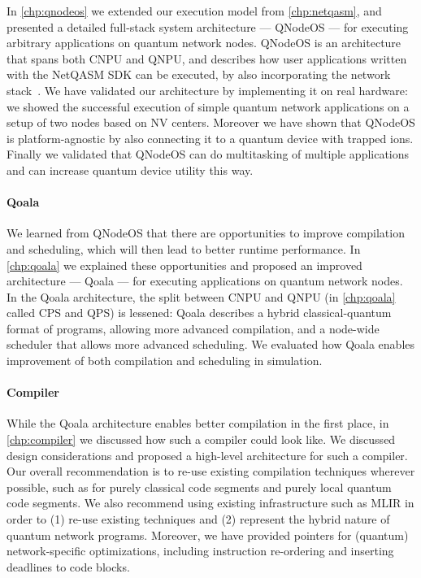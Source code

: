 In \cref{chp:qnodeos} we extended our execution model from \cref{chp:netqasm}, and presented a detailed full-stack system architecture --- QNodeOS --- for executing arbitrary applications on quantum network nodes.
QNodeOS is an architecture that spans both CNPU and QNPU, and describes how user applications written with the NetQASM SDK can be executed, by also incorporating the network stack~\cite{dahlberg2019linklayer,kozlowski2020networklayer}.
We have validated our architecture by implementing it on real hardware: we showed the successful execution of simple quantum network applications on a setup of two nodes based on NV centers.
Moreover we have shown that QNodeOS is platform-agnostic by also connecting it to a quantum device with trapped ions.
Finally we validated that QNodeOS can do multitasking of multiple applications and can increase quantum device utility this way.

\paragraph{Qoala}
We learned from QNodeOS that there are opportunities to improve compilation and scheduling, which will then lead to better runtime performance.
In \cref{chp:qoala} we explained these opportunities and proposed an improved architecture --- Qoala --- for executing applications on quantum network nodes.
In the Qoala architecture, the split between CNPU and QNPU (in \cref{chp:qoala} called CPS and QPS) is lessened: Qoala describes a hybrid classical-quantum format of programs, allowing more advanced compilation, and a node-wide scheduler that allows more advanced scheduling.
We evaluated how Qoala enables improvement of both compilation and scheduling in simulation.

\paragraph{Compiler}
While the Qoala architecture enables better compilation in the first place, in \cref{chp:compiler} we discussed how such a compiler could look like.
We discussed design considerations and proposed a high-level architecture for such a compiler.
Our overall recommendation is to re-use existing compilation techniques wherever possible, such as for purely classical code segments and purely local quantum code segments.
We also recommend using existing infrastructure such as MLIR in order to (1) re-use existing techniques and (2) represent the hybrid nature of quantum network programs.
Moreover, we have provided pointers for (quantum) network-specific optimizations, including instruction re-ordering and inserting deadlines to code blocks.




